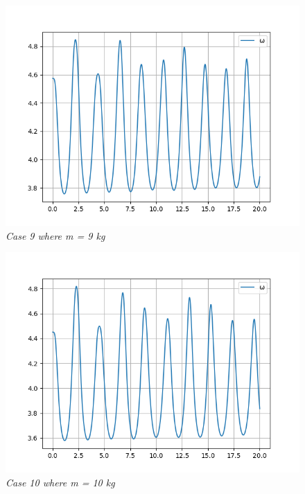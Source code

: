         \begin{figure}[H]
            \centering
            \includegraphics{Appendix/RSimPictures/AF/afm9.png}
            \caption{\textit{Case 9 where m = 9 kg}}
            \label{}
        \end{figure}
            
        \begin{figure}[H]
            \centering
            \includegraphics{Appendix/RSimPictures/AF/afm10.png}
            \caption{\textit{Case 10 where m = 10 kg}}
            \label{}
        \end{figure}
            
            


